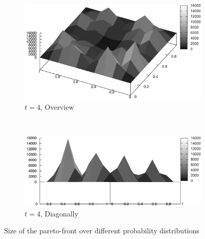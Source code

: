 \documentclass{article}
\begin{document}
\begin{figure}
		\centering
		\begin{subfigure}[b]{0.45\textwidth}
			\centering
			\includegraphics[width=\textwidth]{images/r4_bird}
			\caption{$t=4$, Overview}
			\label{fig:r4_bird}
		\end{subfigure}
		~
		\begin{subfigure}[b]{0.45\textwidth}
			\centering
			\includegraphics[width=\textwidth]{images/r4_diagonal}
			\caption{$t=4$, Diagonally}
			\label{fig:r4_diagonal}
		\end{subfigure}
		\caption{Size of the pareto-front over different probability
		distributions}
		\label{fig:3d_size}
	\end{figure}
\end{document}
